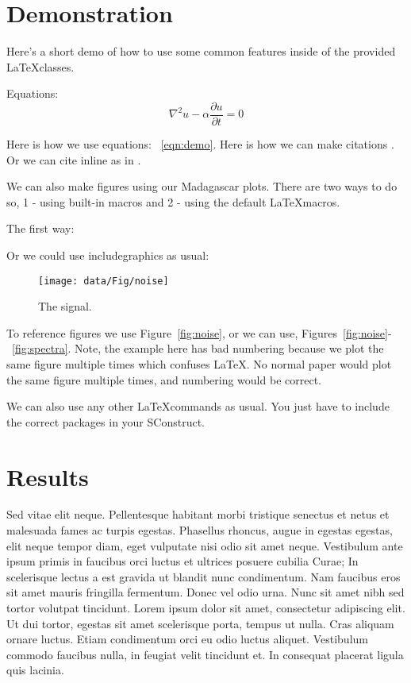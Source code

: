 \section{Demonstration}
Here's a short demo of how to use some common features inside of the provided \LaTeX classes.

Equations:
\begin{equation}
    \nabla^2 u - \alpha \frac{\partial u}{\partial t} = 0
\label{eqn:demo}
\end{equation}

Here is how we use equations: ~\ref{eqn:demo}.  Here is how we can make citations \cite[]{godwin_blended_2010,krebs_fast_2009,duquet_3d_1999}. Or we can cite inline as in \cite{godwin_blended_2010}.

We can also make figures using our Madagascar plots.  There are two ways to do so, 1 - using built-in macros and 2 - using the default \LaTeX macros.

The first way:



Or we could use includegraphics as usual:

\begin{figure}
    \texttt{[image: data/Fig/noise]} 
    \caption{The signal.}
\label{Fig:noise}
\end{figure}

To reference figures we use Figure~\ref{fig:noise}, or we can use, Figures~\ref{fig:noise}-~\ref{fig:spectra}. Note, the example here has bad numbering because we plot the same figure multiple times which confuses \LaTeX.  No normal paper would plot the same figure multiple times, and numbering would be correct.

We can also use any other \LaTeX commands as usual.  You just have to include the correct packages in your SConstruct.

\section{Results}

Sed vitae elit neque. Pellentesque habitant morbi tristique senectus et netus et malesuada fames ac turpis egestas. Phasellus rhoncus, augue in egestas egestas, elit neque tempor diam, eget vulputate nisi odio sit amet neque. Vestibulum ante ipsum primis in faucibus orci luctus et ultrices posuere cubilia Curae; In scelerisque lectus a est gravida ut blandit nunc condimentum. Nam faucibus eros sit amet mauris fringilla fermentum. Donec vel odio urna. Nunc sit amet nibh sed tortor volutpat tincidunt. Lorem ipsum dolor sit amet, consectetur adipiscing elit. Ut dui tortor, egestas sit amet scelerisque porta, tempus ut nulla. Cras aliquam ornare luctus. Etiam condimentum orci eu odio luctus aliquet. Vestibulum commodo faucibus nulla, in feugiat velit tincidunt et. In consequat placerat ligula quis lacinia.

